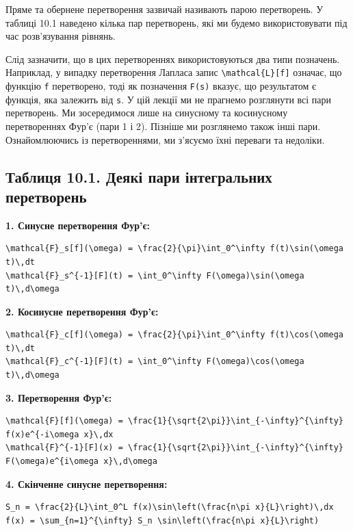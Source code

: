 \documentclass[
  ukrainian,
]{article}
\begin{document}
Пряме та обернене перетворення зазвичай називають парою перетворень. У
таблиці 10.1 наведено кілька пар перетворень, які ми будемо
використовувати під час розв'язування рівнянь.

Слід зазначити, що в цих перетвореннях використовуються два типи
позначень. Наприклад, у випадку перетворення Лапласа запис
\texttt{\textbackslash{}mathcal\{L\}{[}f{]}} означає, що функцію
\texttt{f} перетворено, тоді як позначення \texttt{F(s)} вказує, що
результатом є функція, яка залежить від \texttt{s}. У цій лекції ми не
прагнемо розглянути всі пари перетворень. Ми зосередимося лише на
синусному та косинусному перетвореннях Фур'є (пари 1 і 2). Пізніше ми
розглянемо також інші пари. Ознайомлюючись із перетвореннями, ми
з'ясуємо їхні переваги та недоліки.

\subsection{Таблиця 10.1. Деякі пари інтегральних
перетворень}\label{ux442ux430ux431ux43bux438ux446ux44f-10.1.-ux434ux435ux44fux43aux456-ux43fux430ux440ux438-ux456ux43dux442ux435ux433ux440ux430ux43bux44cux43dux438ux445-ux43fux435ux440ux435ux442ux432ux43eux440ux435ux43dux44c}

\textbf{1. Синусне перетворення Фур'є:}

\begin{verbatim}
\mathcal{F}_s[f](\omega) = \frac{2}{\pi}\int_0^\infty f(t)\sin(\omega t)\,dt
\mathcal{F}_s^{-1}[F](t) = \int_0^\infty F(\omega)\sin(\omega t)\,d\omega
\end{verbatim}

\textbf{2. Косинусне перетворення Фур'є:}

\begin{verbatim}
\mathcal{F}_c[f](\omega) = \frac{2}{\pi}\int_0^\infty f(t)\cos(\omega t)\,dt
\mathcal{F}_c^{-1}[F](t) = \int_0^\infty F(\omega)\cos(\omega t)\,d\omega
\end{verbatim}

\textbf{3. Перетворення Фур'є:}

\begin{verbatim}
\mathcal{F}[f](\omega) = \frac{1}{\sqrt{2\pi}}\int_{-\infty}^{\infty} f(x)e^{-i\omega x}\,dx
\mathcal{F}^{-1}[F](x) = \frac{1}{\sqrt{2\pi}}\int_{-\infty}^{\infty} F(\omega)e^{i\omega x}\,d\omega
\end{verbatim}

\textbf{4. Скінченне синусне перетворення:}

\begin{verbatim}
S_n = \frac{2}{L}\int_0^L f(x)\sin\left(\frac{n\pi x}{L}\right)\,dx
f(x) = \sum_{n=1}^{\infty} S_n \sin\left(\frac{n\pi x}{L}\right)
\end{verbatim}
\end{document}
